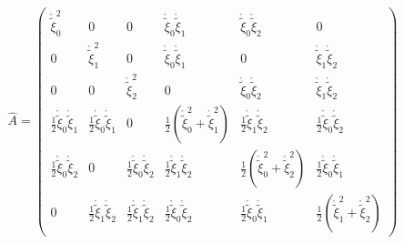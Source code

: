 \documentclass[11pt]{article}
\newcommand{\xir}{\mathring{\widetilde{\xi}}}
\begin{document}
\begin{equation}
\widehat{A} = \begin{pmatrix}
    \xir_0^2 & 0 & 0 & \xir_0\xir_1 & \xir_0\xir_2 & 0 \\[2ex]
    0 & \xir_1^2 & 0 & \xir_0\xir_1 & 0 & \xir_1\xir_2\\[2ex]
    0 & 0 & \xir_2^2 & 0 & \xir_0\xir_2 & \xir_1\xir_2\\[2ex]
    \frac{1}{2}\xir_0\xir_1 & \frac{1}{2}\xir_0\xir_1 & 0 & \frac{1}{2}(\xir_0^2+\xir_1^2) & \frac{1}{2}\xir_1\xir_2 & \frac{1}{2}\xir_0\xir_2\\[2ex]
    \frac{1}{2}\xir_0\xir_2 & 0 & \frac{1}{2}\xir_0\xir_2 & \frac{1}{2}\xir_1\xir_2 & \frac{1}{2}(\xir_0^2+\xir_2^2) & \frac{1}{2}\xir_0\xir_1\\[2ex]
    0 & \frac{1}{2}\xir_1\xir_2 & \frac{1}{2}\xir_1\xir_2 & \frac{1}{2}\xir_0\xir_2 & \frac{1}{2}\xir_0\xir_1 & \frac{1}{2}(\xir_1^2+\xir_2^2)
    \end{pmatrix}
\end{equation}
\end{document}
